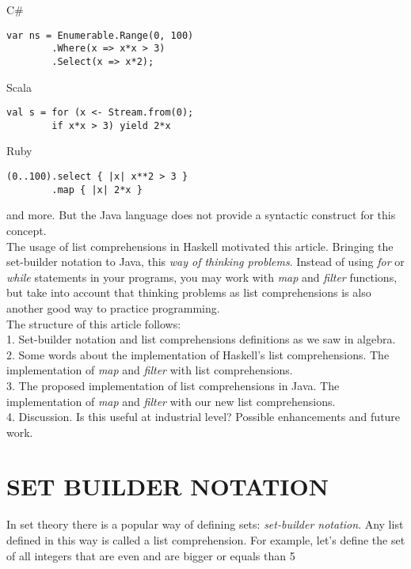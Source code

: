 \documentclass[%
 reprint,
 amsmath,amssymb,
 aps,
]{revtex4-1}
\begin{document}
	C\#

	\begin{lstlisting}[frame=none]
var ns = Enumerable.Range(0, 100)
        .Where(x => x*x > 3)
        .Select(x => x*2);
	\end{lstlisting}

	Scala

	\begin{lstlisting}[frame=none]
val s = for (x <- Stream.from(0);
        if x*x > 3) yield 2*x
	\end{lstlisting}

	Ruby

	\begin{lstlisting}[frame=none]
(0..100).select { |x| x**2 > 3 }
        .map { |x| 2*x }
	\end{lstlisting}

	and more. But the Java language does not provide a syntactic construct for this concept.\\

	The usage of list comprehensions in Haskell motivated this article. Bringing the set-builder notation to Java, this \emph{way of thinking problems}. Instead of using \emph{for} or \emph{while} statements in your programs, you may work with \emph{map} and \emph{filter} functions, but take into account that thinking problems as list comprehensions is also another good way to practice programming.\\

	The structure of this article follows:\\
		1. Set-builder notation and list comprehensions definitions as we saw in algebra.\\
		2. Some words about the implementation of Haskell's list comprehensions. The implementation of \emph{map} and \emph{filter} with list comprehensions.\\
		3. The proposed implementation of list comprehensions in Java. The implementation of \emph{map} and \emph{filter} with our new list comprehensions.\\
		4. Discussion. Is this useful at industrial level? Possible enhancements and future work.\\

\section{SET BUILDER NOTATION}


	In set theory there is a popular way of defining sets: \emph{set-builder notation}. Any list defined in this way is called a list comprehension.
    For example, let's define the set of all integers that are even and are bigger or equals than 5
\end{document}
